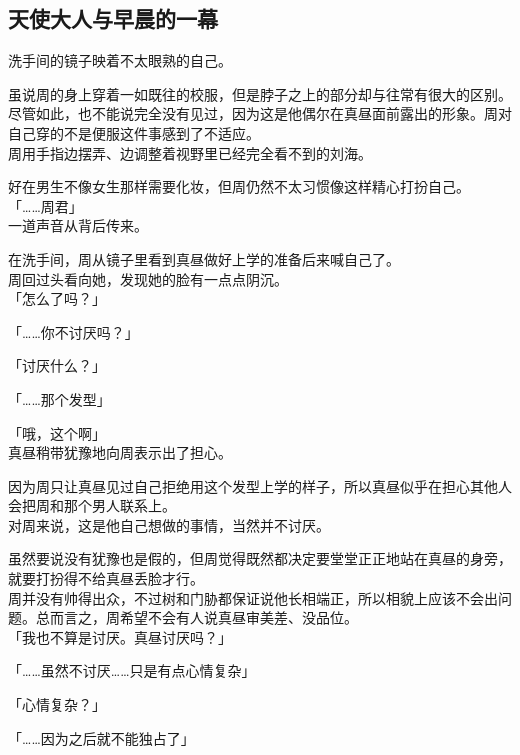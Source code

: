\subsection{天使大人与早晨的一幕}

洗手间的镜子映着不太眼熟的自己。

虽说周的身上穿着一如既往的校服，但是脖子之上的部分却与往常有很大的区别。尽管如此，也不能说完全没有见过，因为这是他偶尔在真昼面前露出的形象。周对自己穿的不是便服这件事感到了不适应。\\

周用手指边摆弄、边调整着视野里已经完全看不到的刘海。

好在男生不像女生那样需要化妆，但周仍然不太习惯像这样精心打扮自己。\\

「……周君」\\

一道声音从背后传来。

在洗手间，周从镜子里看到真昼做好上学的准备后来喊自己了。\\

周回过头看向她，发现她的脸有一点点阴沉。\\

「怎么了吗？」

「……你不讨厌吗？」

「讨厌什么？」

「……那个发型」

「哦，这个啊」\\

真昼稍带犹豫地向周表示出了担心。

因为周只让真昼见过自己拒绝用这个发型上学的样子，所以真昼似乎在担心其他人会把周和那个男人联系上。\\

对周来说，这是他自己想做的事情，当然并不讨厌。

虽然要说没有犹豫也是假的，但周觉得既然都决定要堂堂正正地站在真昼的身旁，就要打扮得不给真昼丢脸才行。\\

周并没有帅得出众，不过树和门胁都保证说他长相端正，所以相貌上应该不会出问题。总而言之，周希望不会有人说真昼审美差、没品位。\\

「我也不算是讨厌。真昼讨厌吗？」

「……虽然不讨厌……只是有点心情复杂」

「心情复杂？」

「……因为之后就不能独占了」\\

